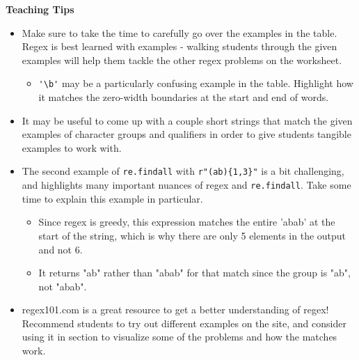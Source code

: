 \begin{guide}
\begin{blocksection}
\textbf{Teaching Tips}
    \begin{itemize}
        \item Make sure to take the time to carefully go over the examples in the table. Regex is best learned with examples - walking students through the given examples will help them tackle the other regex problems on the worksheet.
        \begin{itemize}
            \item \lstinline{'\b'} may be a particularly confusing example in the table. Highlight how it matches the zero-width boundaries at the start and end of words.
        \end{itemize}
        \item It may be useful to come up with a couple short strings that match the given examples of character groups and qualifiers in order to give students tangible examples to work with.
        \item The second example of \lstinline{re.findall} with \lstinline$r"(ab){1,3}"$ is a bit challenging, and highlights many important nuances of regex and \lstinline{re.findall}. Take some time to explain this example in particular.
        \begin{itemize}
            \item Since regex is greedy, this expression matches the entire 'abab' at the start of the string, which is why there are only 5 elements in the output and not 6.
            \item It returns "ab" rather than "abab" for that match since the group is "ab", not "abab". 
        \end{itemize}
        \item regex101.com is a great resource to get a better understanding of regex! Recommend students to try out different examples on the site, and consider using it in section to visualize some of the problems and how the matches work.
    \end{itemize}
\end{blocksection}
\end{guide}
    
